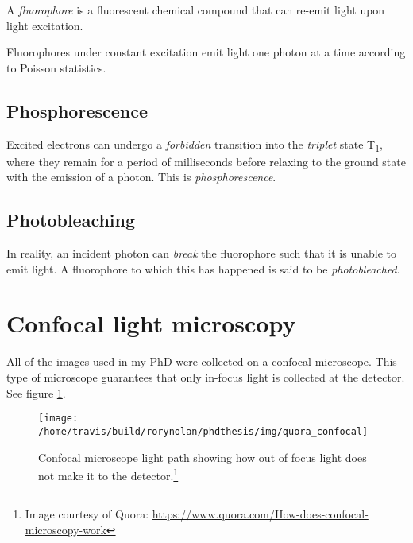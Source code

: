 \documentclass[12pt,]{book}
\let\rmarkdownfootnote\footnote%
\def\footnote{\protect\rmarkdownfootnote}
\theoremstyle{definition}
\theoremstyle{definition}
\theoremstyle{definition}
\theoremstyle{remark}
\let\BeginKnitrBlock\begin \let\EndKnitrBlock\end
\begin{document}
\BeginKnitrBlock{definition}
\protect\hypertarget{def:unnamed-chunk-3}{}{\label{def:unnamed-chunk-3} }A
\emph{fluorophore} is a fluorescent chemical compound that can re-emit
light upon light excitation.
\EndKnitrBlock{definition}

Fluorophores under constant excitation emit light one photon at a time
according to Poisson statistics.

\subsection{Phosphorescence}\label{phosphorescence}

\BeginKnitrBlock{definition}
\protect\hypertarget{def:unnamed-chunk-4}{}{\label{def:unnamed-chunk-4}
}Excited electrons can undergo a \emph{forbidden} transition into the
\emph{triplet} state T\textsubscript{1}, where they remain for a period
of milliseconds before relaxing to the ground state with the emission of
a photon. This is \emph{phosphorescence}.
\EndKnitrBlock{definition}

\subsection{Photobleaching}\label{photobleaching}

In reality, an incident photon can \emph{break} the fluorophore such
that it is unable to emit light. A fluorophore to which this has
happened is said to be \emph{photobleached}.

\section{Confocal light microscopy}\label{confocal-light-microscopy}

All of the images used in my PhD were collected on a confocal
microscope. This type of microscope guarantees that only in-focus light
is collected at the detector. See figure \ref{fig:confocal}.





\begin{figure}

\texttt{[image: /home/travis/build/rorynolan/phdthesis/img/quora\_confocal]} \hfill{}

\caption{Confocal microscope light path showing how out of
focus light does not make it to the detector.\footnote{Image courtesy of
  Quora: \url{https://www.quora.com/How-does-confocal-microscopy-work}}}\label{fig:confocal}
\end{figure}
\end{document}
